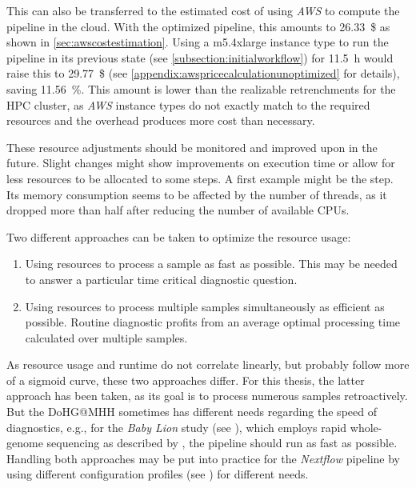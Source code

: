 This can also be transferred to the estimated cost of using \textit{\ac{AWS}} to compute the pipeline in the cloud. With the optimized pipeline, this amounts to \SI{26.33}{\$} as shown in \cref{sec:awscostestimation}. Using a m5.4xlarge instance type to run the pipeline in its previous state (see \cref{subsection:initialworkflow}) for \SI{11.5}{\hour} would raise this to \SI{29.77}{\$} (see \cref{appendix:awspricecalculationunoptimized} for details), saving \SI{11.56}{\percent}. This amount is lower than the realizable retrenchments for the \ac{HPC} cluster, as \textit{\ac{AWS}} instance types do not exactly match to the required resources and the overhead produces more cost than necessary.

These resource adjustments should be monitored and improved upon in the future. Slight changes might show improvements on execution time or allow for less resources to be allocated to some steps. A first example might be the  step. Its memory consumption seems to be affected by the number of threads, as it dropped more than half after reducing the number of available CPUs.

Two different approaches can be taken to optimize the resource usage: 
\begin{enumerate}
    \item Using resources to process a sample as fast as possible. This may be needed to answer a particular time critical diagnostic question.
    \item Using resources to process multiple samples simultaneously as efficient as possible. Routine diagnostic profits from an average optimal processing time calculated over multiple samples. 
\end{enumerate}
As resource usage and runtime do not correlate linearly, but probably follow more of a sigmoid curve, these two approaches differ. For this thesis, the latter approach has been taken, as its goal is to process numerous samples retroactively. But the \ac{DoHG@MHH} sometimes has different needs regarding the speed of diagnostics, e.g., for the \textit{Baby Lion} study (see \autocite{MedizinischeHochschuleHannover2022}), which employs rapid whole-genome sequencing as described by \citeauthor{Saunders2012} \autocite{Saunders2012}, the pipeline should run as fast as possible. Handling both approaches may be put into practice for the \textit{Nextflow} pipeline by using different configuration profiles (see \autocite[Config profiles]{SeqeraLabs2022e}) for different needs.

